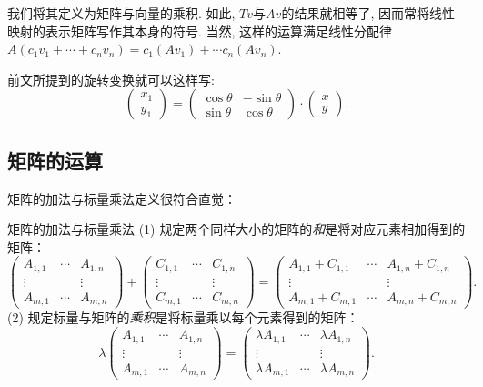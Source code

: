 我们将其定义为矩阵与向量的乘积. 如此, $Tv$与$Av$的结果就相等了, 因而常将线性映射的表示矩阵写作其本身的符号. 当然, 这样的运算满足线性分配律$A(c_1v_1 + \cdots + c_nv_n) = c_1(Av_1) + \cdots c_n(Av_n)$. 

前文所提到的旋转变换就可以这样写: $$\begin{pmatrix}
		x_1 \\ y_1
	\end{pmatrix} = \begin{pmatrix}
		\cos \theta & -\sin \theta \\ \sin \theta & \cos \theta
	\end{pmatrix} \cdot \begin{pmatrix}
		x \\ y
	\end{pmatrix}.$$



\subsection{矩阵的运算}

矩阵的加法与标量乘法定义很符合直觉：

\begin{definition}{矩阵的加法与标量乘法}
	(1) 规定两个同样大小的矩阵的\textit{和}是将对应元素相加得到的矩阵：$$\begin{pmatrix}
		A_{1,1} & \cdots & A_{1,n} \\
		\vdots &  & \vdots \\
		A_{m,1} & \cdots & A_{m,n}
	\end{pmatrix} + \begin{pmatrix}
		C_{1,1} & \cdots & C_{1,n} \\
		\vdots &  & \vdots \\
		C_{m,1} & \cdots & C_{m,n}
	\end{pmatrix} = \begin{pmatrix}
		A_{1,1}+C_{1,1} & \cdots & A_{1,n}+C_{1,n} \\
		\vdots &  & \vdots \\
		A_{m,1}+C_{m,1} & \cdots & A_{m,n}+C_{m,n}
	\end{pmatrix}.$$
	(2) 规定标量与矩阵的\textit{乘积}是将标量乘以每个元素得到的矩阵：$$\lambda \begin{pmatrix}
		A_{1,1} & \cdots & A_{1,n} \\
		\vdots &  & \vdots \\
		A_{m,1} & \cdots & A_{m,n}
	\end{pmatrix} = \begin{pmatrix}
		\lambda A_{1,1} & \cdots & \lambda A_{1,n} \\
		\vdots &  & \vdots \\
		\lambda A_{m,1} & \cdots & \lambda A_{m,n}
	\end{pmatrix}.$$
\end{definition}

